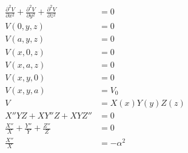 \documentclass{article}
\begin{document}
\begin{align*}
  \frac{\partial^2 V}{\partial x^2} + \frac{\partial^2 V}{\partial y^2} + \frac{\partial^2 V}{\partial z^2} & = 0                                                                             \\
  V(0, y, z)                                                                                                & = 0                                                                             \\
  V(a, y, z)                                                                                                & = 0                                                                             \\
  V(x, 0, z)                                                                                                & = 0                                                                             \\
  V(x, a, z)                                                                                                & = 0                                                                             \\
  V(x, y, 0)                                                                                                & = 0                                                                             \\
  V(x, y, a)                                                                                                & = V_0                                                                           \\
  V                                                                                                         & = X(x) Y(y) Z(z)                                                                \\
  X'' Y Z + X Y'' Z + X Y Z''                                                                               & = 0                                                                             \\
  \frac{X''}{X} + \frac{Y''}{Y} + \frac{Z''}{Z}                                                             & = 0                                                                             \\
  \frac{X''}{X}                                                                                             & = -\alpha^2                                                                     \\

\end{align*}
\end{document}
